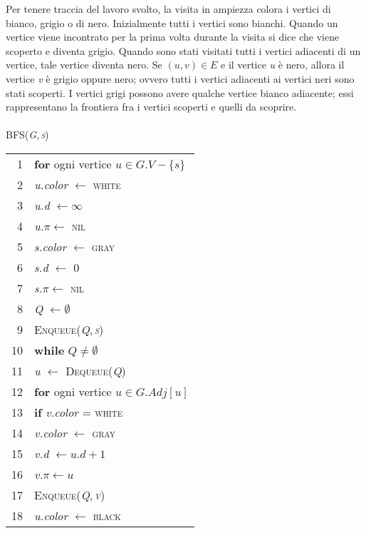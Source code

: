 \documentclass[10pt, a4paper]{report}
\newcommand\firsttab[1][0.5cm]{\hspace*{#1}}
\newcommand\secondtab[1][1cm]{\hspace*{#1}}
\newcommand\thirdtab[1][1.5cm]{\hspace*{#1}}
\begin{document}
Per tenere traccia del lavoro svolto, la visita in ampiezza colora i vertici di bianco, grigio o di nero. Inizialmente tutti i vertici sono bianchi. Quando un vertice viene incontrato per la prima volta durante la visita si dice che viene scoperto e diventa grigio. Quando sono stati visitati tutti i vertici adiacenti di un vertice, tale vertice diventa nero. Se $(u,v) \in E$ e il vertice \textit{u} è nero, allora il vertice \textit{v} è grigio oppure nero; ovvero tutti i vertici adiacenti ai vertici neri sono stati scoperti. I vertici grigi possono avere qualche vertice bianco adiacente; essi rappresentano la frontiera fra i vertici scoperti e quelli da scoprire.\\\\
\textsc{BFS(\textit{G},\,\textit{s})}\\
\begin{tabular}{rl}
1&\textbf{for} ogni vertice $u \in G.V - \{s\}$\\
2&\firsttab\textit{u.color} $\leftarrow$ \textsc{white}\\
3&\firsttab\textit{u.d} $\leftarrow \infty$\\
4&\firsttab\textit{u.}$\pi \leftarrow$ \textsc{nil}\\
5&\textit{s.color} $\leftarrow$ \textsc{gray}\\
6&\textit{s.d} $\leftarrow$ 0\\
7&\textit{s.}$\pi \leftarrow$ \textsc{nil}\\
8&\textit{Q} $\leftarrow \emptyset$\\
9&\textsc{Enqueue(\textit{Q},\,\textit{s})}\\
10&\textbf{while} $Q \neq \emptyset$\\
11&\firsttab\textit{u} $\leftarrow$ \textsc{Dequeue(\textit{Q})}\\
12&\firsttab\textbf{for} ogni vertice $u \in G.Adj[u]$\\
13&\secondtab\textbf{if} \textit{v.color} = \textsc{white}\\
14&\thirdtab\textit{v.color} $\leftarrow$ \textsc{gray}\\
15&\thirdtab\textit{v.d} $\leftarrow u.d + 1$\\
16&\thirdtab\textit{v.}$\pi \leftarrow u$\\
17&\thirdtab\textsc{Enqueue(\textit{Q},\,\textit{v})}\\
18&\firsttab\textit{u.color} $\leftarrow$ \textsc{black}
\end{tabular}\\\\
\end{document}
